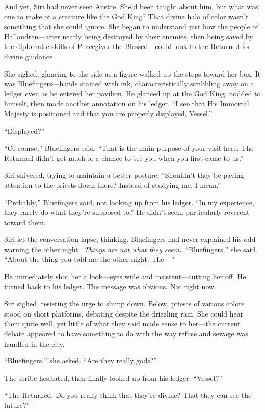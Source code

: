 And yet, Siri had never seen Austre. She’d been taught about him, but what was one to make of a creature like the God King? That divine halo of color wasn’t something that she could ignore. She began to understand just how the people of Hallandren—after nearly being destroyed by their enemies, then being saved by the diplomatic skills of Peacegiver the Blessed—could look to the Returned for divine guidance.

She sighed, glancing to the side as a figure walked up the steps toward her box. It was Bluefingers—hands stained with ink, characteristically scribbling away on a ledger even as he entered her pavilion. He glanced up at the God King, nodded to himself, then made another annotation on his ledger. “I see that His Immortal Majesty is positioned and that you are properly displayed, Vessel.”

“Displayed?”

“Of course,” Bluefingers said. “That is the main purpose of your visit here. The Returned didn’t get much of a chance to see you when you first came to us.”

Siri shivered, trying to maintain a better posture. “Shouldn’t they be paying attention to the priests down there? Instead of studying me, I mean.”

“Probably,” Bluefingers said, not looking up from his ledger. “In my experience, they rarely do what they’re supposed to.” He didn’t seem particularly reverent toward them.

Siri let the conversation lapse, thinking. Bluefingers had never explained his odd warning the other night.~\textit{Things are not what they seem.}~“Bluefingers,” she said. “About the thing you told me the other night. The—”

He immediately shot her a look—eyes wide and insistent—cutting her off. He turned back to his ledger. The message was obvious. Not right now.

Siri sighed, resisting the urge to slump down. Below, priests of various colors stood on short platforms, debating despite the drizzling rain. She could hear them quite well, yet little of what they said made sense to her—the current debate appeared to have something to do with the way refuse and sewage was handled in the city.

“Bluefingers,” she asked. “Are they really gods?”

The scribe hesitated, then finally looked up from his ledger. “Vessel?”

“The Returned. Do you really think that they’re divine? That they can see the future?”

